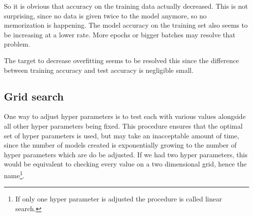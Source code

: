 So it is obvious that accuracy on the training data actually decreased.
This is not surprising, since no data is given twice to the model anymore, so no memorization is happening.
The model accuracy on the training set also seems to be increasing at a lower rate.
More epochs or bigger batches may resolve that problem.

The target to decrease overfitting seems to be resolved this since the difference between training accuracy and test accuracy is negligible small.

\subsection{Grid search}
One way to adjust hyper parameters is to test each with various values alongside all other hyper parameters being fixed.
This procedure ensures that the optimal set of hyper parameters is used, but may take an inacceptable amount of time, since the number of models created is exponentially growing to the number of hyper parameters which are do be adjusted.
If we had two hyper parameters, this would be equivalent to checking every value on a two dimensional grid, hence the name\footnote{If only one hyper parameter is adjusted the procedure is called linear search.}.
